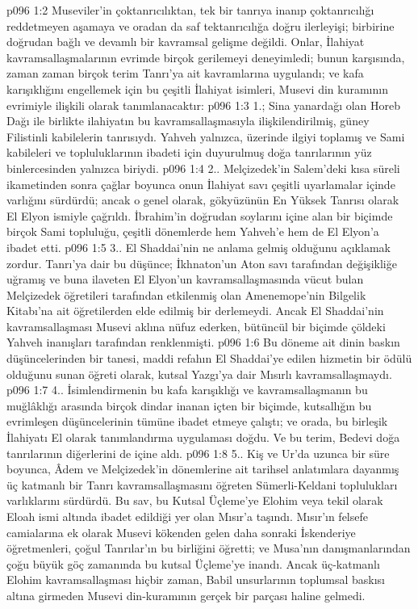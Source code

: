 \vs p096 1:2 Museviler’in çoktanrıcılıktan, tek bir tanrıya inanıp çoktanrıcılığı reddetmeyen aşamaya ve oradan da saf tektanrıcılığa doğru ilerleyişi; birbirine doğrudan bağlı ve devamlı bir kavramsal gelişme değildi. Onlar, İlahiyat kavramsallaşmalarının evrimde birçok gerilemeyi deneyimledi; bunun karşısında, zaman zaman birçok terim Tanrı’ya ait kavramlarına uygulandı; ve kafa karışıklığını engellemek için bu çeşitli İlahiyat isimleri, Musevi din kuramının evrimiyle ilişkili olarak tanımlanacaktır:
\vs p096 1:3 1.\bibnobreakspace {}; Sina yanardağı olan Horeb Dağı ile birlikte ilahiyatın bu kavramsallaşmasıyla ilişkilendirilmiş, güney Filistinli kabilelerin tanrısıydı. Yahveh yalnızca, üzerinde ilgiyi toplamış ve Sami kabileleri ve topluluklarının ibadeti için duyurulmuş doğa tanrılarının yüz binlercesinden yalnızca biriydi.
\vs p096 1:4 2.\bibnobreakspace {}. Melçizedek’in Salem’deki kısa süreli ikametinden sonra çağlar boyunca onun İlahiyat savı çeşitli uyarlamalar içinde varlığını sürdürdü; ancak o genel olarak, gökyüzünün En Yüksek Tanrısı olarak El Elyon ismiyle çağrıldı. İbrahim’in doğrudan soylarını içine alan bir biçimde birçok Sami topluluğu, çeşitli dönemlerde hem Yahveh’e hem de El Elyon’a ibadet etti.
\vs p096 1:5 3.. El Shaddai’nin ne anlama gelmiş olduğunu açıklamak zordur. Tanrı’ya dair bu düşünce; İkhnaton’un Aton savı tarafından değişikliğe uğramış ve buna ilaveten El Elyon’un kavramsallaşmasında vücut bulan Melçizedek öğretileri tarafından etkilenmiş olan Amenemope’nin Bilgelik Kitabı’na ait öğretilerden elde edilmiş bir derlemeydi. Ancak El Shaddai’nin kavramsallaşması Musevi aklına nüfuz ederken, bütüncül bir biçimde çöldeki Yahveh inanışları tarafından renklenmişti.
\vs p096 1:6 Bu döneme ait dinin baskın düşüncelerinden bir tanesi, maddi refahın El Shaddai’ye edilen hizmetin bir ödülü olduğunu sunan öğreti olarak, kutsal Yazgı’ya dair Mısırlı kavramsallaşmaydı.
\vs p096 1:7 4.\bibnobreakspace {}. İsimlendirmenin bu kafa karışıklığı ve kavramsallaşmanın bu muğlâklığı arasında birçok dindar inanan içten bir biçimde, kutsallığın bu evrimleşen düşüncelerinin tümüne ibadet etmeye çalıştı; ve orada, bu birleşik İlahiyatı El olarak tanımlandırma uygulaması doğdu. Ve bu terim, Bedevi doğa tanrılarının diğerlerini de içine aldı.
\vs p096 1:8 5.\bibnobreakspace {}. Kiş ve Ur’da uzunca bir süre boyunca, Âdem ve Melçizedek’in dönemlerine ait tarihsel anlatımlara dayanmış üç katmanlı bir Tanrı kavramsallaşmasını öğreten Sümerli\hyp{}Keldani toplulukları varlıklarını sürdürdü. Bu sav, bu Kutsal Üçleme’ye Elohim veya tekil olarak Eloah ismi altında ibadet edildiği yer olan Mısır’a taşındı. Mısır’ın felsefe camialarına ek olarak Musevi kökenden gelen daha sonraki İskenderiye öğretmenleri, çoğul Tanrılar’ın bu birliğini öğretti; ve Musa’nın danışmanlarından çoğu büyük göç zamanında bu kutsal Üçleme’ye inandı. Ancak üç\hyp{}katmanlı Elohim kavramsallaşması hiçbir zaman, Babil unsurlarının toplumsal baskısı altına girmeden Musevi din\hyp{}kuramının gerçek bir parçası haline gelmedi.
